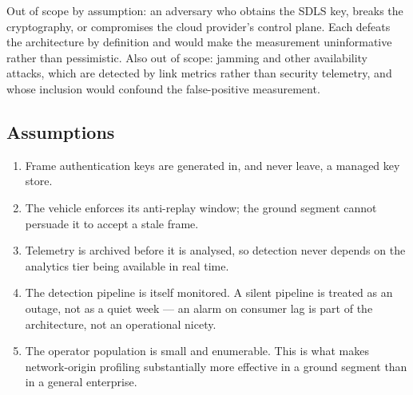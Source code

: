 Out of scope by assumption: an adversary who obtains the SDLS key, breaks the
cryptography, or compromises the cloud provider's control plane. Each defeats the
architecture by definition and would make the measurement uninformative rather
than pessimistic. Also out of scope: jamming and other availability attacks,
which are detected by link metrics rather than security telemetry, and whose
inclusion would confound the false-positive measurement.

\subsection{Assumptions}

\begin{enumerate}
\item Frame authentication keys are generated in, and never leave, a managed key
store.
\item The vehicle enforces its anti-replay window; the ground segment cannot
persuade it to accept a stale frame.
\item Telemetry is archived before it is analysed, so detection never depends on
the analytics tier being available in real time.
\item The detection pipeline is itself monitored. A silent pipeline is treated as
an outage, not as a quiet week --- an alarm on consumer lag is part of the
architecture, not an operational nicety.
\item The operator population is small and enumerable. This is what makes
network-origin profiling substantially more effective in a ground segment than
in a general enterprise.
\end{enumerate}
